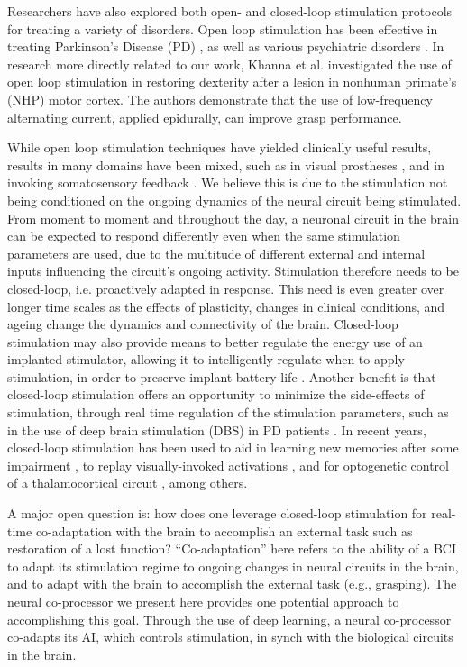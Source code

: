 \documentclass[12pt]{iopart}
\begin{document}
Researchers have also explored both open- and closed-loop stimulation protocols for
treating a variety of disorders. Open loop stimulation has been effective in
treating Parkinson's Disease (PD) \cite{benabid.parkinsons}, as well as various
psychiatric disorders \cite{holtzheimer.psy, kisely.psy, fraint.psy}.
In research more directly related to our work, Khanna et al. \cite{khanna.openloop}
investigated the use of open loop stimulation in restoring dexterity after a lesion
in nonhuman primate's (NHP) motor cortex. The authors demonstrate that the use
of low-frequency alternating current, applied epidurally, can improve grasp performance.

While open loop stimulation techniques have yielded clinically useful results, results
in many domains have been mixed, such as in visual prostheses \cite{bosking.visual},
and in invoking somatosensory feedback \cite{cronin.tact}. We believe this is due to the
stimulation not being conditioned on the ongoing dynamics of the neural circuit being
stimulated. From moment to moment and throughout the day, a neuronal circuit in the brain
can be expected to respond differently even when the same stimulation parameters are used,
due to the multitude of different external and internal inputs influencing the circuit's
ongoing activity. Stimulation therefore needs to be closed-loop, i.e. proactively adapted
in response. This need is even greater over longer time scales as the effects of plasticity,
changes in clinical conditions, and ageing change the dynamics and connectivity of the brain.
Closed-loop stimulation may also provide means to better regulate the energy use of an
implanted stimulator, allowing it to intelligently regulate when to apply stimulation,
in order to preserve implant battery life \cite{castano.pd}. Another benefit is that closed-loop
stimulation offers an opportunity to minimize the side-effects of stimulation, through real
time regulation of the stimulation parameters, such as in the use of deep brain stimulation
(DBS) in PD patients \cite{little.park}. In recent years, closed-loop stimulation has been
used to aid in learning new memories after some impairment \cite{berger.closedloop,
kahana.biomarker}, to replay visually-invoked activations \cite{tafazoli.acls}, and for
optogenetic control of a thalamocortical circuit \cite{bolus.opto}, among others.

A major open question is: how does one leverage closed-loop stimulation for real-time
co-adaptation with the brain to accomplish an external task such as restoration of a lost function?
``Co-adaptation'' here refers to the ability of a BCI to adapt its stimulation regime to ongoing
changes in neural circuits in the brain, and to adapt with the brain to accomplish
the external task (e.g., grasping). The neural co-processor we present here provides one
potential approach to accomplishing this goal. Through the use of deep learning, a neural 
co-processor co-adapts its AI, which controls stimulation, in synch with the biological circuits in the brain.
\end{document}
